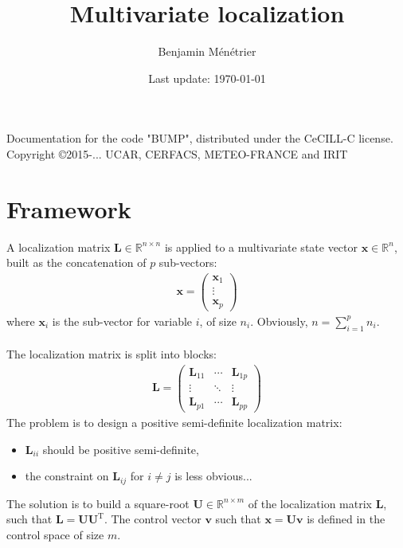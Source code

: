 \documentclass[12pt]{scrartcl}
\begin{document}
\title{Multivariate localization}
\author{Benjamin Ménétrier}
\date{Last update: \today}

\thispagestyle{empty}

\maketitle
\begin{center}
Documentation for the code "BUMP", distributed under the CeCILL-C license.\\
Copyright \copyright 2015-... UCAR, CERFACS, METEO-FRANCE and IRIT
\end{center}

\tableofcontents

\clearpage


\section{Framework}
A localization matrix $\mathbf{L} \in \mathbb{R}^{n \times n}$ is applied to a multivariate state vector $\mathbf{x} \in \mathbb{R}^n$, built as the concatenation of $p$ sub-vectors:
\begin{align}
\mathbf{x} = \left( \begin{array}{c}
\mathbf{x}_1 \\[1ex]
\hline
\vdots \\
\hline
\mathbf{x}_p
\end{array} \right)
\end{align}
where $\mathbf{x}_i$ is the sub-vector for variable $i$, of size $n_i$. Obviously, $\displaystyle n = \sum_{i=1}^p n_i$.\\
$  $\\
The localization matrix is split into blocks:
\begin{align*}
\mathbf{L} = \left( \begin{array}{ccc}
\mathbf{L}_{11} & \cdots & \mathbf{L}_{1p} \\
\vdots & \ddots & \vdots \\
\mathbf{L}_{p1} & \cdots & \mathbf{L}_{pp}
\end{array} \right)
\end{align*}
The problem is to design a positive semi-definite localization matrix:
\begin{itemize}
\item $\mathbf{L}_{ii}$ should be positive semi-definite,
\item the constraint on $\mathbf{L}_{ij}$ for $i \ne j$ is less obvious...
\end{itemize}
The solution is to build a square-root $\mathbf{U} \in \mathbb{R}^{n \times m}$ of the localization matrix $\mathbf{L}$, such that $\mathbf{L} = \mathbf{UU}^\textrm{T}$. The control vector $\mathbf{v}$ such that $\mathbf{x} = \mathbf{U} \mathbf{v}$ is defined in the control space of size $m$.\\
\end{document}
